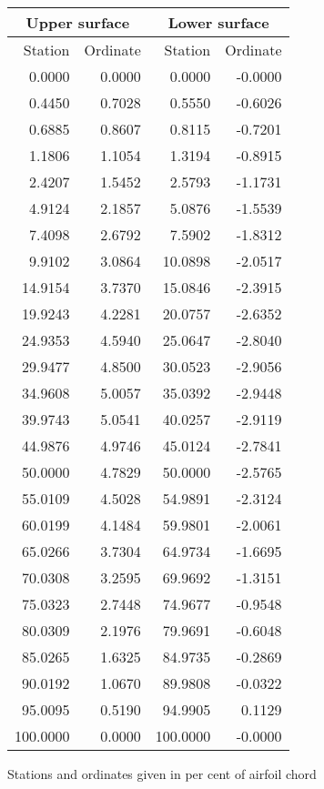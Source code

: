 \documentclass[11pt]{book}
\begin{document}
 \hspace{4mm}
 \begin{tabular}{|r|r|r|r|} \hline 
 \multicolumn{2}{|c|}{Upper surface} & \multicolumn{2}{|c|}{Lower surface} \\
 \hline
 Station & Ordinate & Station & Ordinate \\
 \hline
0.0000 & 0.0000 & 0.0000 & -0.0000 \\
0.4450 & 0.7028 & 0.5550 & -0.6026 \\
0.6885 & 0.8607 & 0.8115 & -0.7201 \\
1.1806 & 1.1054 & 1.3194 & -0.8915 \\
2.4207 & 1.5452 & 2.5793 & -1.1731 \\
4.9124 & 2.1857 & 5.0876 & -1.5539 \\
7.4098 & 2.6792 & 7.5902 & -1.8312 \\
9.9102 & 3.0864 & 10.0898 & -2.0517 \\
14.9154 & 3.7370 & 15.0846 & -2.3915 \\
19.9243 & 4.2281 & 20.0757 & -2.6352 \\
24.9353 & 4.5940 & 25.0647 & -2.8040 \\
29.9477 & 4.8500 & 30.0523 & -2.9056 \\
34.9608 & 5.0057 & 35.0392 & -2.9448 \\
39.9743 & 5.0541 & 40.0257 & -2.9119 \\
44.9876 & 4.9746 & 45.0124 & -2.7841 \\
50.0000 & 4.7829 & 50.0000 & -2.5765 \\
55.0109 & 4.5028 & 54.9891 & -2.3124 \\
60.0199 & 4.1484 & 59.9801 & -2.0061 \\
65.0266 & 3.7304 & 64.9734 & -1.6695 \\
70.0308 & 3.2595 & 69.9692 & -1.3151 \\
75.0323 & 2.7448 & 74.9677 & -0.9548 \\
80.0309 & 2.1976 & 79.9691 & -0.6048 \\
85.0265 & 1.6325 & 84.9735 & -0.2869 \\
90.0192 & 1.0670 & 89.9808 & -0.0322 \\
95.0095 & 0.5190 & 94.9905 & 0.1129 \\
100.0000 & 0.0000 & 100.0000 & -0.0000 \\
 \hline 
 \end{tabular}
 \vspace{8mm}

Stations and ordinates given in per cent of airfoil chord
\end{document}
